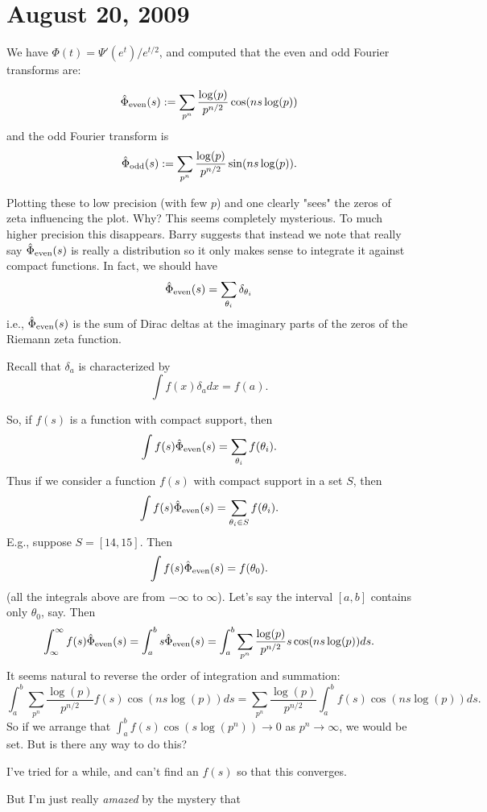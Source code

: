 \documentclass{article}
\begin{document}
\section{August 20, 2009}

We have $\Phi(t) = \Psi'(e^t)/e^{t/2}$, and computed that the even and odd
Fourier transforms are:

$${\hat \Phi}_{\rm even}(s): = \sum_{p^n} {\frac{\log(p)}{p^{n/2}}}\cos(ns \log(p))$$ 
and the odd Fourier transform is
$${\hat \Phi}_{\rm odd}(s): = \sum_{p^n} {\frac{\log(p)}{p^{n/2}}}\sin(ns \log(p)).$$
   
   
Plotting these to low precision (with few $p$) and one clearly "sees" the zeros of zeta influencing
the plot.   Why?  This seems completely mysterious.   To much higher precision this disappears.
Barry suggests that instead we note that really say
${\hat \Phi}_{\rm even}(s)$ is really a distribution so it only makes sense to
integrate it against compact functions.  In fact, we should have
$$
   {\hat \Phi}_{\rm even}(s) = \sum_{\theta_i} \delta_{\theta_i}
$$
i.e., ${\hat \Phi}_{\rm even}(s)$ is the sum of Dirac deltas at the imaginary parts
of the zeros of the Riemann zeta function.

Recall that $\delta_a$ is characterized by 
$$
\int f(x) \delta_a dx = f(a).
$$

So, if $f(s)$ is a function with compact support, then 
$$
  \int f(s) {\hat \Phi}_{\rm even}(s) = \sum_{\theta_i} f(\theta_i).
$$
Thus if we consider a function $f(s)$ with compact support in a set $S$, then
$$
  \int f(s) {\hat \Phi}_{\rm even}(s) = \sum_{\theta_i\in S} f(\theta_i).
$$
E.g., suppose $S=[14,15]$.  Then 
$$
  \int f(s) {\hat \Phi}_{\rm even}(s) = f(\theta_0).
$$
(all the integrals above are from $-\infty$ to $\infty$).
 Let's say the interval $[a,b]$ contains only $\theta_0$, say.
Then 
$$
\int_{\infty}^{\infty} f(s) {\hat \Phi}_{\rm even}(s)
 = 
\int_{a}^{b} s {\hat \Phi}_{\rm even}(s)
= \int_{a}^{b} \sum_{p^n} {\frac{\log(p)}{p^{n/2}}} s\cos(ns \log(p))  ds.
$$
It seems natural to reverse the order of integration and summation:
$$
\int_{a}^{b} \sum_{p^n} {\frac{\log(p)}{p^{n/2}}} f(s)\cos(ns \log(p))  ds
 = 
 \sum_{p^n} {\frac{\log(p)}{p^{n/2}}} \int_{a}^{b} f(s)\cos(ns\log(p)) ds.
$$
So if we arrange that $\int_{a}^{b} f(s)\cos(s\log(p^n)) \to 0$ as
$p^n\to\infty$, we would be set.   But is there any way to do this?


I've tried for a while, and can't find an $f(s)$ so that this converges.

But I'm just really {\em amazed} by the mystery that 
\end{document}
